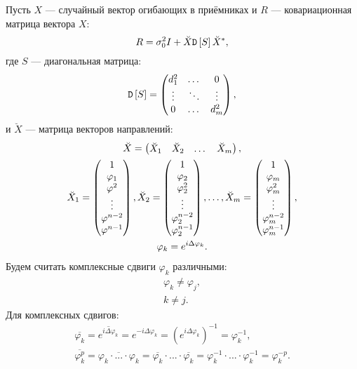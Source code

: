 Пусть $X$ --- случайный вектор огибающих в приёмниках и $R$ --- ковариационная матрица вектора $X$:
\[
    R = \sigma_0^2 I + \breve{X} \mathtt{D} \left[ S \right] \breve{X}^* ,
\]
где $S$ --- диагональная матрица:
\[
    \mathtt{D} \left[ S \right]
    = \begin{pmatrix}
        d_1^2  & \dots  & 0      \\
        \vdots & \ddots & \vdots \\
        0      & \dots  & d_m^2
    \end{pmatrix} ,
\]
и $\breve{X}$ --- матрица векторов направлений:
\begin{gather*}
    \breve{X}
    = \begin{pmatrix}
        \breve{X}_1 & \breve{X}_2 & \dots & \breve{X}_m
    \end{pmatrix} ,
    \notag \\
    \breve{X}_1
    = \begin{pmatrix}
        1             \\
        \varphi_1     \\
        \varphi^2     \\
        \vdots        \\
        \varphi^{n-2} \\
        \varphi^{n-1}
    \end{pmatrix}
    ,
    \breve{X}_2
    = \begin{pmatrix}
        1               \\
        \varphi_2       \\
        \varphi_2^2     \\
        \vdots          \\
        \varphi_2^{n-2} \\
        \varphi_2^{n-1}
    \end{pmatrix}
    ,
    \dots
    ,
    \breve{X}_m
    = \begin{pmatrix}
        1               \\
        \varphi_m       \\
        \varphi_m^2     \\
        \vdots          \\
        \varphi_m^{n-2} \\
        \varphi_m^{n-1}
    \end{pmatrix} , \\
    \varphi_k = e^{i \Delta \varphi_k} .
\end{gather*}
Будем считать комплексные сдвиги $\varphi_k$ различными:
\begin{gather*}
    \varphi_k \neq \varphi_j , \\
    k \neq j .
\end{gather*}
Для комплексных сдвигов:
\begin{gather*}
    \overline{\varphi_k}
    = \overline{e^{i \Delta \varphi_k}}
    = e^{- i \Delta \varphi_k}
    = \left( e^{i \Delta \varphi_k} \right)^{-1}
    = \varphi_k^{-1} , \\
    \overline{\varphi_k^p}
    = \overline{\varphi_k \cdot ... \cdot \varphi_k}
    = \overline{\varphi_k} \cdot ... \cdot \overline{\varphi_k}
    = \varphi_k^{-1} \cdot ... \cdot \varphi_k^{-1}
    = \varphi_k^{-p} .
\end{gather*}

